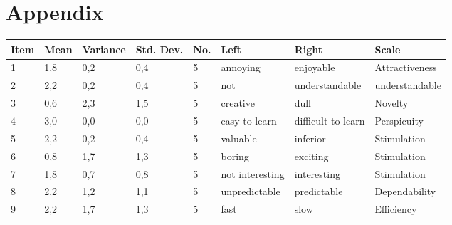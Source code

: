 \documentclass[conference,onecolumn]{IEEEtran}
\begin{document}
	

\newpage
\section*{Appendix}

    \begin{table}[H]	
        \begin{center}
            \begin{tabular}[H]{ |m{1cm}|m{1cm}|m{1.2cm}|m{1.2cm}|m{1cm}|m{2cm}|m{3cm}|m{2cm}|}
                \hline
                \textbf{Item}&\textbf{Mean} &\textbf{Variance} &\textbf{Std. Dev.}  &\textbf{No.}  &\textbf{Left} &\textbf{Right} &\textbf{Scale}\\ \hline
                1	&1,8	&0,2	&0,4	&5	&annoying	            &enjoyable	                &Attractiveness             \\ \hline
                2	&2,2	&0,2	&0,4	&5	&not                    &understandable	            &understandable         \\ \hline
                3	&0,6	&2,3	&1,5	&5	&creative	            &dull	                    &Novelty        \\ \hline
                4	&3,0	&0,0	&0,0	&5	&easy to learn	        &difficult to learn	        &Perspicuity        \\ \hline
                5	&2,2	&0,2	&0,4	&5	&valuable	            &inferior	                &Stimulation        \\ \hline
                6	&0,8	&1,7	&1,3	&5	&boring	                &exciting	                &Stimulation        \\ \hline
                7	&1,8	&0,7	&0,8	&5	&not interesting	    &interesting	            &Stimulation        \\ \hline
                8	&2,2	&1,2	&1,1	&5	&unpredictable	        &predictable	            &Dependability      \\ \hline
                9	&2,2	&1,7	&1,3	&5	&fast	                &slow	                    &Efficiency     \\ \hline

\end{tabular}
\end{center}
\end{table}
\end{document}
